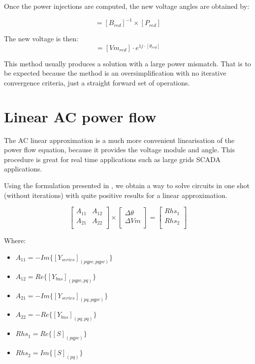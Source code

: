 \documentclass[nols,a4paper,twoside,notoc,fleqn]{tufte-book}
\begin{document}
Once the power injections are computed, the new voltage angles are obtained by:

\begin{equation}
[\theta_{red}] = [B_{red}]^{-1} \times [P_{red}]
\end{equation}

The new voltage is then:
\begin{equation}
[{V}_{red}] = [{Vm}_{red}] \cdot e^{1j \cdot  [\theta_{red}]}
\end{equation}

This method usually produces a solution with a large power mismatch. That is to be expected because the method is an oversimplification with no iterative convergence criteria, just a straight forward set of operations.


\section{Linear AC power flow} \label{ACPF}

The AC linear approximation is a much more convenient linearisation of the power flow equation, because it provides the voltage module and angle. This procedure is great for real time applications such as large grids SCADA applications.

Using the formulation presented in \cite{rossoni2016linearized}, we obtain a way to solve circuits in one shot (without iterations) with quite positive results for a linear approximation.

\begin{equation}
\begin{bmatrix}
A_{11} & A_{12} \\
A_{21} & A_{22} \\
\end{bmatrix}
\times
\begin{bmatrix}
\Delta \theta\\
\Delta Vm\\
\end{bmatrix}
=
\begin{bmatrix}
Rhs_1\\
Rhs_2\\
\end{bmatrix}
\label{eq:AC_linear_power_flow}
\end{equation}

Where:
\begin{itemize}
	\item $A_{11} = -Im \{ [Y_{series}]_{(pqpv, pqpv)} \}$
	\item $A_{12} = Re \{ [Y_{bus}]_{(pqpv, pq)} \}$
	\item $A_{21} = -Im \{ [Y_{series}]_{(pq, pqpv)} \}$
	\item $A_{22} = -Re \{ [Y_{bus}]_{(pq, pq)} \}$
	\item $Rhs_1 = Re \{ [S]_{(pqpv)} \} $
	\item $Rhs_2 = Im \{ [S]_{(pq)} \} $\newline
\end{itemize}
\end{document}
